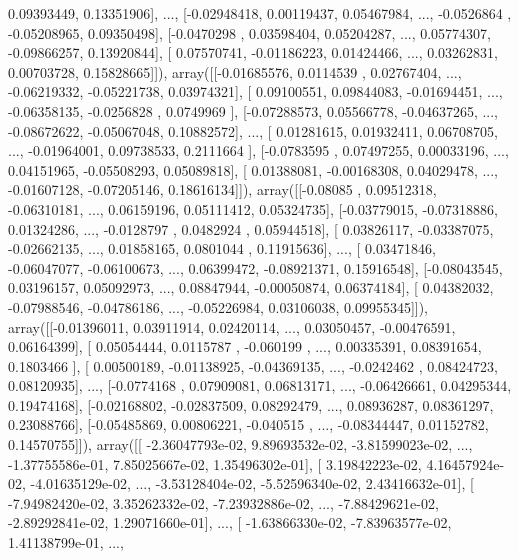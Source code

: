 \documentclass{article}
\begin{document}
         0.09393449,  0.13351906],
       ..., 
       [-0.02948418,  0.00119437,  0.05467984, ..., -0.0526864 ,
        -0.05208965,  0.09350498],
       [-0.0470298 ,  0.03598404,  0.05204287, ...,  0.05774307,
        -0.09866257,  0.13920844],
       [ 0.07570741, -0.01186223,  0.01424466, ...,  0.03262831,
         0.00703728,  0.15828665]]), array([[-0.01685576,  0.0114539 ,  0.02767404, ..., -0.06219332,
        -0.05221738,  0.03974321],
       [ 0.09100551,  0.09844083, -0.01694451, ..., -0.06358135,
        -0.0256828 ,  0.0749969 ],
       [-0.07288573,  0.05566778, -0.04637265, ..., -0.08672622,
        -0.05067048,  0.10882572],
       ..., 
       [ 0.01281615,  0.01932411,  0.06708705, ..., -0.01964001,
         0.09738533,  0.2111664 ],
       [-0.0783595 ,  0.07497255,  0.00033196, ...,  0.04151965,
        -0.05508293,  0.05089818],
       [ 0.01388081, -0.00168308,  0.04029478, ..., -0.01607128,
        -0.07205146,  0.18616134]]), array([[-0.08085   ,  0.09512318, -0.06310181, ...,  0.06159196,
         0.05111412,  0.05324735],
       [-0.03779015, -0.07318886,  0.01324286, ..., -0.0128797 ,
         0.0482924 ,  0.05944518],
       [ 0.03826117, -0.03387075, -0.02662135, ...,  0.01858165,
         0.0801044 ,  0.11915636],
       ..., 
       [ 0.03471846, -0.06047077, -0.06100673, ...,  0.06399472,
        -0.08921371,  0.15916548],
       [-0.08043545,  0.03196157,  0.05092973, ...,  0.08847944,
        -0.00050874,  0.06374184],
       [ 0.04382032, -0.07988546, -0.04786186, ..., -0.05226984,
         0.03106038,  0.09955345]]), array([[-0.01396011,  0.03911914,  0.02420114, ...,  0.03050457,
        -0.00476591,  0.06164399],
       [ 0.05054444,  0.0115787 , -0.060199  , ...,  0.00335391,
         0.08391654,  0.1803466 ],
       [ 0.00500189, -0.01138925, -0.04369135, ..., -0.0242462 ,
         0.08424723,  0.08120935],
       ..., 
       [-0.0774168 ,  0.07909081,  0.06813171, ..., -0.06426661,
         0.04295344,  0.19474168],
       [-0.02168802, -0.02837509,  0.08292479, ...,  0.08936287,
         0.08361297,  0.23088766],
       [-0.05485869,  0.00806221, -0.040515  , ..., -0.08344447,
         0.01152782,  0.14570755]]), array([[ -2.36047793e-02,   9.89693532e-02,  -3.81599023e-02, ...,
         -1.37755586e-01,   7.85025667e-02,   1.35496302e-01],
       [  3.19842223e-02,   4.16457924e-02,  -4.01635129e-02, ...,
         -3.53128404e-02,  -5.52596340e-02,   2.43416632e-01],
       [ -7.94982420e-02,   3.35262332e-02,  -7.23932886e-02, ...,
         -7.88429621e-02,  -2.89292841e-02,   1.29071660e-01],
       ..., 
       [ -1.63866330e-02,  -7.83963577e-02,   1.41138799e-01, ...,
\end{document}
